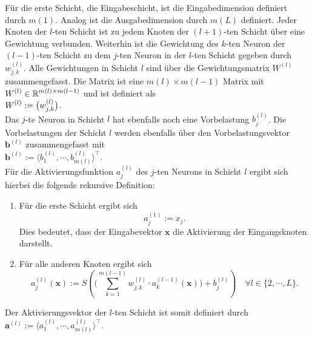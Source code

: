 \noindent
Für die erste Schicht, die Eingabeschicht, ist die Eingabedimension definiert durch $m(1)$. Analog ist die Ausgabedimension durch $m(L)$ definiert. Jeder Knoten der $l$-ten Schicht ist zu jedem Knoten der $(l+1)$-ten Schicht über eine Gewichtung verbunden. Weiterhin ist die Gewichtung des $k$-ten Neuron der $(l-1)$-ten Schicht zu dem $j$-ten Neuron in der $l$-ten Schicht gegeben durch $w_{j,k}^{(l)}$. Alle Gewichtungen in Schicht $l$ sind über die Gewichtungsmatrix $W^{(l)}$ zusammengefasst. Die Matrix ist eine $m(l) \times m(l-1)$ Matrix mit $\displaystyle W^{(l)} \in \mathbb{R}^{m(l) \times m(l-1)}$ und ist definiert als
\\[0.2cm]
\hspace*{1.3cm}
$\displaystyle W^{(l)} := \bigl( w_{j,k}^{(l)} \bigr)$.
\\[0.2cm]
Das $j$-te Neuron in Schicht $l$ hat ebenfalls noch eine Vorbelastung $b_j^{(l)}$. Die Vorbelastungen der Schicht $l$ werden ebenfalls über den Vorbelastungsvektor $\mathbf{b}^{(l)}$ zusammengefasst mit
\\[0.2cm]
\hspace*{1.3cm}
$\mathbf{b}^{(l)} := \langle b_1^{(l)}, \cdots, b_{m(l)}^{(l)} \rangle^\top$.
\\[0.2cm]
Für die Aktivierungsfunktion $a_j^{(l)}$ des $j$-ten Neurons in Schicht $l$ ergibt sich hierbei die folgende rekursive Definition:
\begin{enumerate}
\item Für die erste Schicht ergibt sich
      \begin{equation}
        \label{eq:feedforward1}
       a^{(1)}_j := x_j.
      \end{equation}
      Dies bedeutet, dass der Eingabevektor $\mathbf{x}$ die Aktivierung der Eingangsknoten darstellt.
\item Für alle anderen Knoten ergibt sich
      \begin{equation}
         \label{eq:feedforward2}
         a_j^{(l)}(\mathbf{x}) := 
             S\left(\Biggl(\sum\limits_{k=1}^{m(l-1)} w_{j,k}^{(l)}\cdot a_k^{(l-1)}(\mathbf{x})\Biggr) + b_{j}^{(l)}\right) 
        \quad \mbox{$\forall l \in \{2, \cdots, L\}$}.
\end{equation}
\end{enumerate}
Der Aktivierungsvektor der $l$-ten Schicht ist somit definiert durch
\\[0.2cm]
\hspace*{1.3cm}
$\mathbf{a}^{(l)} := \langle a_1^{(l)}, \cdots, a_{m(l)}^{(l)} \rangle^\top$.
\\[0.2cm]
